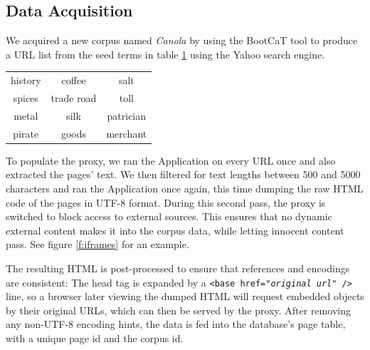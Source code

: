 \subsection{Data Acquisition\label{datagather}}

We acquired a new corpus named \textit{Canola} by using the BootCaT \cite{bootcat} tool to produce a URL list from the seed terms in table \ref{t:seed} using the Yahoo search engine. 

\begin{table}
\label{t:seed}
\centering
{}
\begin{tabular}[h]{ccc}
        history
&        coffee 
&        salt \\
        spices 
&        trade road
&        toll \\
        metal
&        silk 
&        patrician \\
        pirate 
&        goods
&        merchant 
\end{tabular}
\end{table}


To populate the proxy, we ran the Application on every URL once and also extracted the pages' text.
We then filtered for text lengths between 500 and 5000 characters and ran the Application once again, this time dumping the raw HTML code of the pages in UTF-8 format.
During this second pass, the proxy is switched to block access to external sources.
This ensures that no dynamic external content makes it into the corpus data, while letting innocent content pass.
See figure \ref{f:iframes} for an example.


The resulting HTML is post-processed to ensure that references and encodings are consistent:
The head tag is expanded by a \texttt{<base href="\textit{original url}" />} line, so a browser later viewing the dumped HTML will request embedded objects by their original URLs, which can then be served by the proxy.
After removing any non-UTF-8 encoding hints, the data is fed into the database's page table, with a unique page id and the corpus id.

